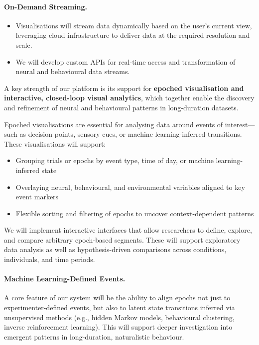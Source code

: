 \paragraph{On-Demand Streaming.}
\begin{itemize}
          \item Visualisations will stream data dynamically based on the user’s
              current view, leveraging cloud infrastructure to deliver data at
              the required resolution and scale.
                \item We will develop custom APIs for real-time access and
                    transformation of neural and behavioural data streams.
\end{itemize}

\label{sec:visEpoched}

A key strength of our platform is its support for \textbf{epoched visualisation and interactive, closed-loop visual analytics}, which together enable the discovery and refinement of neural and behavioural patterns in long-duration datasets.

Epoched visualisations are essential for analysing data around events of interest—such as decision points, sensory cues, or machine learning-inferred transitions. These visualisations will support:
\begin{itemize}
  \item Grouping trials or epochs by event type, time of day, or machine learning-inferred state
  \item Overlaying neural, behavioural, and environmental variables aligned to key event markers
  \item Flexible sorting and filtering of epochs to uncover context-dependent patterns
\end{itemize}

We will implement interactive interfaces that allow researchers to define, explore, and compare arbitrary epoch-based segments. These will support exploratory data analysis as well as hypothesis-driven comparisons across conditions, individuals, and time periods.

\paragraph{Machine Learning-Defined Events.}
A core feature of our system will be the ability to align epochs not just to experimenter-defined events, but also to latent state transitions inferred via unsupervised methods (e.g., hidden Markov models, behavioural clustering, inverse reinforcement learning). This will support deeper investigation into emergent patterns in long-duration, naturalistic behaviour.

